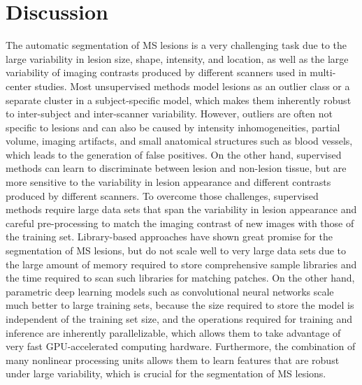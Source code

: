 \section{Discussion}




The automatic segmentation of MS lesions is a very challenging task due to the
large variability in lesion size, shape, intensity, and location, as well as the
large variability of imaging contrasts produced by different scanners used in
multi-center studies. Most unsupervised methods model lesions as an outlier
class or a separate cluster in a subject-specific model, which makes them inherently
robust to inter-subject and inter-scanner variability. However, outliers are
often not specific to lesions and can also be caused by intensity
inhomogeneities, partial volume, imaging artifacts, and small anatomical structures such as blood
vessels, which leads to the generation of false positives. On the other hand,
supervised methods can learn to discriminate between lesion and non-lesion
tissue, but are more sensitive to the variability in lesion appearance and
different contrasts produced by different scanners. To overcome those
challenges, supervised methods require large data sets that span the variability
in lesion appearance and careful pre-processing to match the imaging contrast of new
images with those of the training set. Library-based approaches have shown great
promise for the segmentation of MS lesions, but do not scale well to very large
data sets due to the large amount of memory required to store comprehensive
sample libraries and the time required to scan such libraries for matching
patches. On the other hand, parametric deep learning models such as
convolutional neural networks scale much better to large training sets, because
the size required to store the model is independent of the training set size,
and the operations required for training and inference are inherently
parallelizable, which allows them to take advantage of very fast GPU-accelerated
computing hardware. Furthermore, the combination of many nonlinear processing
units allows them to learn features that are robust under large variability,
which is crucial for the segmentation of MS lesions.

